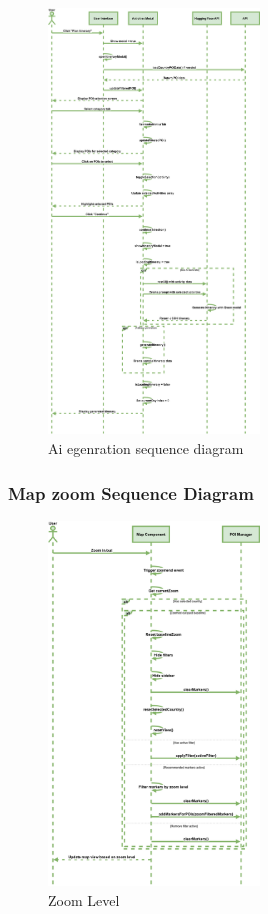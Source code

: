 \documentclass[]{project_final}
\begin{document}
\begin{figure}[ht!]
  \centering
  \includegraphics[width=0.5\textwidth]{TPaiGenerationSequence.png}
  \vspace*{0.0cm}
  \caption{Ai egenration sequence diagram}
  \label{fig:1}
\end{figure}
\newpage
\subsubsection{Map zoom Sequence Diagram}

\begin{figure}[ht!]
  \centering
  \includegraphics[width=0.5\textwidth]{TPZoomSequenecediagram.png}
  \vspace*{0.0cm}
  \caption{Zoom Level}
  \label{fig:1}
\end{figure}
\end{document}
